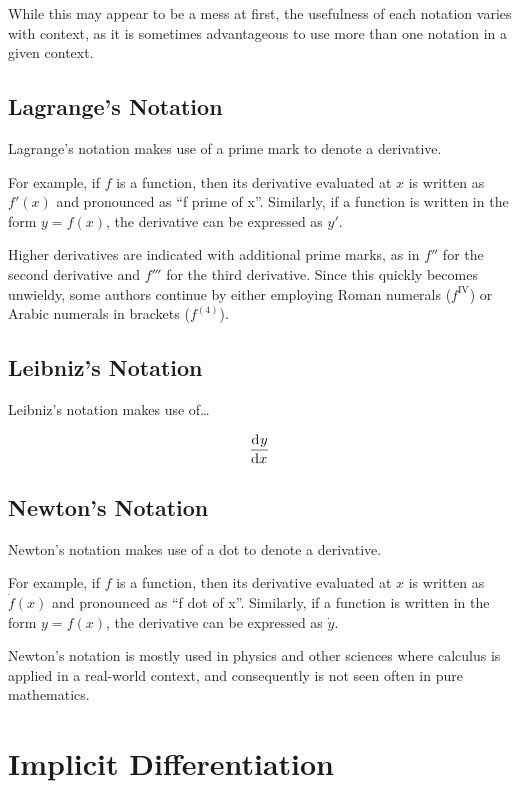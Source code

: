 \documentclass[headings=standardclasses]{scrreprt}
\begin{document}
While this may appear to be a mess at first, the usefulness of each notation
varies with context, as it is sometimes advantageous to use more than one
notation in a given context.

\subsection{Lagrange's Notation}

Lagrange's notation makes use of a prime mark to denote a derivative.

For example, if \(f\) is a function, then its derivative evaluated at \(x\) is
written as \(f'(x)\) and pronounced as \enquote{f prime of x}. Similarly, if a
function is written in the form \(y = f(x)\), the derivative can be expressed as
\(y'\).

Higher derivatives are indicated with additional prime marks, as in \(f''\) for
the second derivative and \(f'''\) for the third derivative. Since this quickly
becomes unwieldy, some authors continue by either employing Roman numerals
(\(f^{\mathrm{IV}}\)) or Arabic numerals in brackets (\(f^{(4)}\)).

\subsection{Leibniz's Notation}

Leibniz's notation makes use of\ldots

\[ \frac{\operatorname{d\!}{^{}}y}{\operatorname{d\!}{x^{}}} \]

\subsection{Newton's Notation}

Newton's notation makes use of a dot to denote a derivative.

For example, if \(f\) is a function, then its derivative evaluated at \(x\) is
written as \(\dot f(x)\) and pronounced as \enquote{f dot of x}. Similarly, if a
function is written in the form \(y = f(x)\), the derivative can be expressed as
\(\dot y\).

Newton's notation is mostly used in physics and other sciences where calculus is
applied in a real-world context, and consequently is not seen often in pure
mathematics.

\section{Implicit Differentiation}
\end{document}
